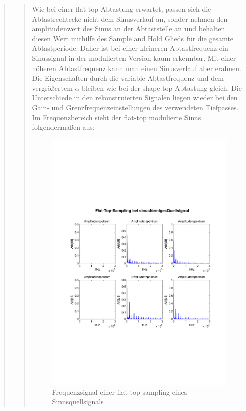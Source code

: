 \begin{quote}
\begin{quote}
           Wie bei einer flat-top Abtastung erwartet, passen sich die
           Abtastrechtecke nicht dem Sinusverlauf an, sonder nehmen den
           amplitudenwert des Sinus an der Abtaststelle an und behalten diesen
           Wert mithilfe des Sample and Hold Glieds für die gesamte
           Abtastperiode. Daher ist bei einer kleineren Abtastfrequenz ein
           Sinussignal in der modulierten Version kaum erkennbar. Mit einer
           höheren Abtastfrequenz kann man einen Sinusverlauf aber erahnen. Die
           Eigenschaften durch die variable Abtastfrequenz und dem vergrößertem
           $\alpha$ bleiben wie bei der shape-top Abtastung gleich. Die
           Unterschiede in den rekonstruierten Signalen liegen wieder bei den
           Gain- und Grenzfrequenzeinstellungen des verwendeten Tiefpasses.\\
           
           Im Frequenzbereich sieht der flat-top modulierte Sinus folgendermaßen
           aus:
           
           \begin{figure}[H]
            \centering
            \includegraphics[scale=0.6, trim = 1.5cm 6cm 1cm 8cm,
            clip]{./Bilder/flat-top-sinus_freq}
                \caption{Frequenzsignal einer flat-top-sampling eines Sinusquellsignals}
      	    \end{figure}
           

\end{quote}
\end{quote}
